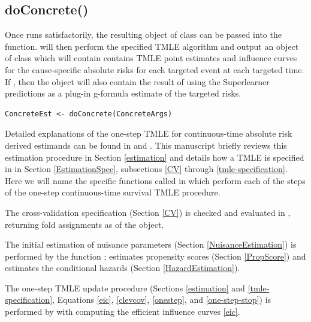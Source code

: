 \documentclass{report}
\newcommand{\1}{\ensuremath{\mathbf{1}}}
\begin{document}
\subsection{doConcrete()}
\label{doConcrete}
Once  runs satisfactorily, the resulting object of class  can be passed into the  function.  will then perform the specified TMLE algorithm and output an object of class  which will contain contains TMLE point estimates and influence curves for the cause-specific absolute risks for each targeted event at each targeted time. If , then the  object will also contain the result of using the Superlearner predictions as a plug-in g-formula estimate of the targeted risks. 

\begin{lstlisting}
ConcreteEst <- doConcrete(ConcreteArgs)
\end{lstlisting}

Detailed explanations of the one-step TMLE for continuous-time absolute risk derived estimands can be found in \cite{rytgaard_one-step_2021} and \cite{rytgaard_continuous-time_2021}. This manuscript briefly reviews this estimation procedure in Section \ref{estimation} and details how a TMLE is specified in  in Section \ref{EstimationSpec}, subsections \ref{CV} through \ref{tmle-specification}. Here we will name the specific functions called in  which perform each of the steps of the one-step continuous-time survival TMLE procedure.

The cross-validation specification (Section \ref{CV}) is checked and evaluated in , returning fold assignments as  of the  object.

The initial estimation of nuisance parameters (Section \ref{NuisanceEstimation}) is performed by the function ;  estimates propensity scores (Section \ref{PropScore}) and  estimates the conditional hazards (Section \ref{HazardEstimation}).

The one-step TMLE update procedure (Sections \ref{estimation} and \ref{tmle-specification}, Equations \eqref{eic}, \eqref{clevcov}, \eqref{onestep}, and \eqref{one-step-stop}) is performed by  with  computing the efficient influence curves \eqref{eic}.
\end{document}
